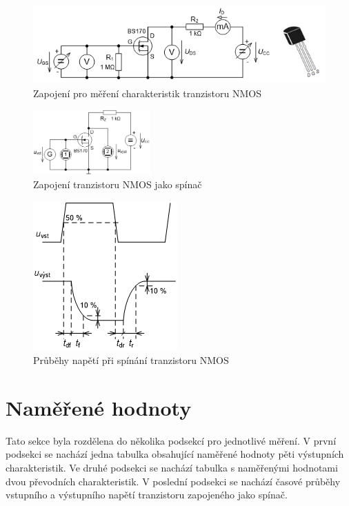 \documentclass[a4paper, czech]{article}
\begin{document}
\begin{figure}[H]
    \centering
    \includegraphics{zapojeni1.png}
    \caption{Zapojení pro měření charakteristik tranzistoru NMOS}
\end{figure}

\begin{figure}[H]
    \centering
    \includegraphics[width=0.4\textwidth]{zapojeni2.png}
    \caption{Zapojení tranzistoru NMOS jako spínač}
\end{figure}

\begin{figure}[H]
    \centering
    \includegraphics{prubehy.png}
    \caption{Průběhy napětí při spínání tranzistoru NMOS}
\end{figure}

\section{Naměřené hodnoty}

Tato sekce byla rozdělena do několika podsekcí pro jednotlivé měření.
V první podsekci se nachází jedna tabulka obsahující naměřené hodnoty pěti výstupních charakteristik.
Ve druhé podsekci se nachází tabulka s naměřenými hodnotami dvou převodních charakteristik.
V poslední podsekci se nachází časové průběhy vstupního a výstupního napětí tranzistoru zapojeného jako spínač.
\end{document}

